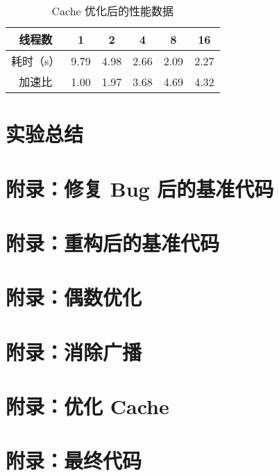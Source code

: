 \documentclass[11pt]{article}
\begin{document}
  \begin{table}[h]
    \centering
    \caption{Cache 优化后的性能数据}
    \label{tab:env}
    \begin{tabular}{cccccc}
      \hline
      线程数 & 1 & 2 & 4 & 8 & 16 \\
      \hline
      耗时（s） & 9.79 & 4.98 & 2.66 & 2.09 & 2.27 \\
      \hline
      加速比 & 1.00 & 1.97 & 3.68 & 4.69 & 4.32 \\
      \hline
    \end{tabular}
  \end{table}

  \section{实验总结}

  \pagebreak
  \appendix
  \lstset{
	  numbers=left,
  }

  \section{附录：修复 Bug 后的基准代码}
  \label{apd:fixed}
  
  \section{附录：重构后的基准代码}
  \label{apd:refactored}
  
  \section{附录：偶数优化}
  \label{apd:no_even}
  
  \section{附录：消除广播}
  \label{apd:no_cast}
  
  \section{附录：优化 Cache}
  \label{apd:better_cache}
  
  \section{附录：最终代码}
  \label{apd:final_version}
\end{document}
